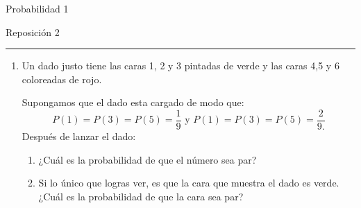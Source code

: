 \documentclass[12pt]{report}
\begin{document}
\begin{center}
    \textsf{\Large Probabilidad 1}
    \par\medskip
    \textsf{\large Reposición 2}
\end{center}
\hrule
\par\bigskip

\begin{enumerate}
    \item Un dado justo tiene las caras 1, 2 y 3 pintadas de verde y las caras 4,5 y 6 coloreadas de rojo. 

    Supongamos que el dado esta cargado  de modo que:
    \begin{equation*}
        P(1)=P(3)=P(5)=\frac{1}{9} \text{ y } P(1)=P(3)=P(5)=\frac{2}{9.}
    \end{equation*}
    Después de lanzar el dado:
    \begin{enumerate}
        \item ¿Cuál es la probabilidad de que el número sea par?
        \item Si lo único que logras ver, es que la cara que muestra el dado es verde. ¿Cuál es la probabilidad de que la cara sea par?
    \end{enumerate}


\end{enumerate}
\end{document}
